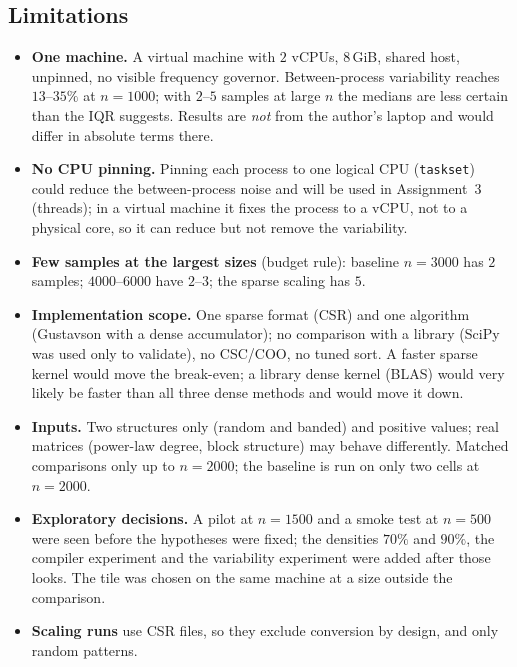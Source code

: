 \subsection{Limitations}
\begin{itemize}
  \item \textbf{One machine.} A virtual machine with $2$ vCPUs, $8$\,GiB, shared host, unpinned, no visible frequency governor. Between-process variability reaches $13$--$35\%$ at $n=1000$; with $2$--$5$ samples at large $n$ the medians are less certain than the IQR suggests. Results are \emph{not} from the author's laptop and would differ in absolute terms there.
  \item \textbf{No CPU pinning.} Pinning each process to one logical CPU (\texttt{taskset}) could reduce the between-process noise and will be used in Assignment~3 (threads); in a virtual machine it fixes the process to a vCPU, not to a physical core, so it can reduce but not remove the variability.
  \item \textbf{Few samples at the largest sizes} (budget rule): baseline $n=3000$ has $2$ samples; $4000$--$6000$ have $2$--$3$; the sparse scaling has $5$.
  \item \textbf{Implementation scope.} One sparse format (CSR) and one algorithm (Gustavson with a dense accumulator); no comparison with a library (SciPy was used only to validate), no CSC/COO, no tuned sort. A faster sparse kernel would move the break-even; a library dense kernel (BLAS) would very likely be faster than all three dense methods and would move it down.
  \item \textbf{Inputs.} Two structures only (random and banded) and positive values; real matrices (power-law degree, block structure) may behave differently. Matched comparisons only up to $n=2000$; the baseline is run on only two cells at $n=2000$.
  \item \textbf{Exploratory decisions.} A pilot at $n=1500$ and a smoke test at $n=500$ were seen before the hypotheses were fixed; the densities $70\%$ and $90\%$, the compiler experiment and the variability experiment were added after those looks. The tile was chosen on the same machine at a size outside the comparison.
  \item \textbf{Scaling runs} use CSR files, so they exclude conversion by design, and only random patterns.
\end{itemize}

